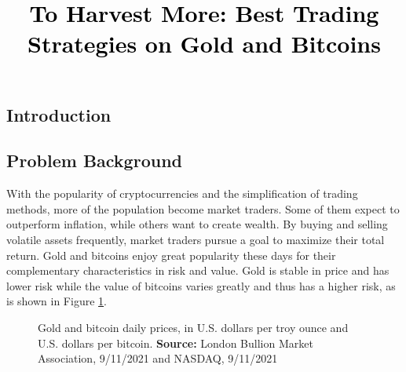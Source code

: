 \documentclass[12pt,a4paper]{article}
\newcommand{\PaperTitle}{To Harvest More: Best Trading Strategies on Gold and Bitcoins}  %
\begin{document}
\thispagestyle{empty}


\newpage

\title{
\Large{\textcolor{black}{\PaperTitle}}
}




\maketitle



\tableofcontents
\setcounter{tocdepth}{2}

\newpage
\setcounter{page}{1}


\begin{spacing}{1.2} 



\section{Introduction}
\label{Problem_Statement}

\subsection{Problem Background}
With the popularity of cryptocurrencies and the simplification of trading methods, more of the population become market traders. Some of them expect to outperform inflation, while others want to create wealth. By buying and selling volatile assets frequently, market traders pursue a goal to maximize their total return. Gold and bitcoins enjoy great popularity these days for their complementary characteristics in risk and value. Gold is stable in price and has lower risk while the value of bitcoins varies greatly and thus has a higher risk, as is shown in Figure \ref{figure:prices2in1}.

\begin{figure}[H]
	\caption{Gold and bitcoin daily prices, in U.S. dollars per troy ounce and U.S. dollars per bitcoin. \textbf{Source:} London Bullion Market 
		Association, 9/11/2021 and NASDAQ, 9/11/2021 }
	\label{figure:prices2in1}
\end{figure}


\end{spacing}
\end{document}
